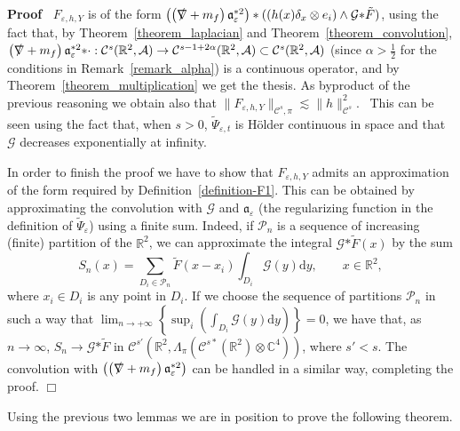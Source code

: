 \documentclass{article}
\newcommand{\asterisk}{\mathord{*}}
\newcommand{\mathd}{\mathrm{d}}
\newenvironment{proof}{\noindent\textbf{Proof\ }}{\hspace*{\fill}$\Box$\medskip}
\newcommand{\slashnabla}{\slashed{\nabla}}
\begin{document}
\begin{proof}
  $F_{\varepsilon, h, Y}$ is of the form $\left( \left( \slashnabla + m_f
  \right) \mathfrak{a}_{\varepsilon}^{\asterisk 2} \right) \ast ((h (x)
  \delta_x \otimes e_i) \wedge \mathcal{G} \asterisk \tilde{F})$, using the
  fact that, by Theorem~\ref{theorem_laplacian} and
  Theorem~\ref{theorem_convolution}, $\left( \slashnabla + m_f \right)
  \mathfrak{a}_{\varepsilon}^{\asterisk 2} \asterisk \cdot : \mathcal{C}^s
  (\mathbb{R}^2, \mathcal{A}) \rightarrow \mathcal{C}^{s - 1 + 2 \alpha}
  (\mathbb{R}^2, \mathcal{A}) \subset \mathcal{C}^s (\mathbb{R}^2,
  \mathcal{A})$ (since $\alpha > \frac{1}{2}$ for the conditions in
  Remark~\ref{remark_alpha}) is a continuous operator, and by
  Theorem~\ref{theorem_multiplication} we get the thesis. As byproduct of the
  previous reasoning we obtain also that $\| F_{\varepsilon, h, Y}
  \|_{\mathcal{C}^s, \pi} \lesssim \| h \|_{\mathcal{C}^s}^2$. \ This can be
  seen using the fact that, when $s > 0$, $\tilde{\Psi}_{\varepsilon, t}$ is
  H{\"o}lder continuous in space and that $\mathcal{G}$ decreases
  exponentially at infinity.
  
  In order to finish the proof we have to show that $F_{\varepsilon, h, Y}$
  admits an approximation of the form required by
  Definition~\ref{definition-F1}. This can be obtained by approximating the
  convolution with $\mathcal{G}$ and $\mathfrak{a}_{\varepsilon}$ (the
  regularizing function in the definition of $\tilde{\Psi}_{\varepsilon}$)
  using a finite sum. Indeed, if $\mathcal{P}_n$ is a sequence of increasing
  (finite) partition of the $\mathbb{R}^2$, we can approximate the integral
  $\mathcal{G} \asterisk \tilde{F} (x)$ by the sum
  \[ S_n (x) = \sum_{D_i \in \mathcal{P}_n}  \tilde{F} (x - x_i) \int_{D_i}
     \mathcal{G} (y) \mathd y, \qquad x \in \mathbb{R}^2, \]
  where $x_i \in D_i$ is any point in $D_i$. If we choose the sequence of
  partitions $\mathcal{P}_n$ in such a way that $\lim_{n \rightarrow + \infty}
  \left\{ \sup_i \left( \int_{D_i} \mathcal{G} (y) \mathd y \right) \right\} =
  0$, we have that, as $n \rightarrow \infty$, $S_n \rightarrow \mathcal{G}
  \asterisk \tilde{F}$ in $\mathcal{C}^{s'} (\mathbb{R}^2, \Lambda_{\pi}
  (\mathcal{C}^{s \ast} (\mathbb{R}^2) \otimes \mathbb{C}^4))$, where $s' <
  s$. The convolution with $\left( \left( \slashnabla + m_f \right)
  \mathfrak{a}_{\varepsilon}^{\asterisk 2} \right)$ can be handled in a
  similar way, completing the proof.
\end{proof}

Using the previous two lemmas we are in position to prove the following
theorem.
\end{document}
